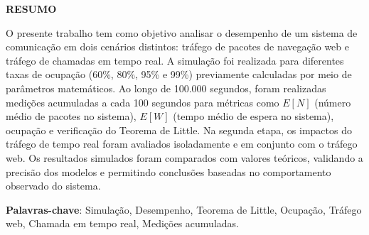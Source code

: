 \begin{center} \textbf{RESUMO} \end{center}

O presente trabalho tem como objetivo analisar o desempenho de um sistema de comunicação em dois cenários distintos: tráfego de pacotes de navegação web e tráfego de chamadas em tempo real. A simulação foi realizada para diferentes taxas de ocupação (60\%, 80\%, 95\% e 99\%) previamente calculadas por meio de parâmetros matemáticos. Ao longo de 100.000 segundos, foram realizadas medições acumuladas a cada 100 segundos para métricas como $E[N]$ (número médio de pacotes no sistema), $E[W]$ (tempo médio de espera no sistema), ocupação e verificação do Teorema de Little. Na segunda etapa, os impactos do tráfego de tempo real foram avaliados isoladamente e em conjunto com o tráfego web. Os resultados simulados foram comparados com valores teóricos, validando a precisão dos modelos e permitindo conclusões baseadas no comportamento observado do sistema.

\vspace{2ex}

\textbf{Palavras-chave}: Simulação, Desempenho, Teorema de Little, Ocupação, Tráfego web, Chamada em tempo real, Medições acumuladas.